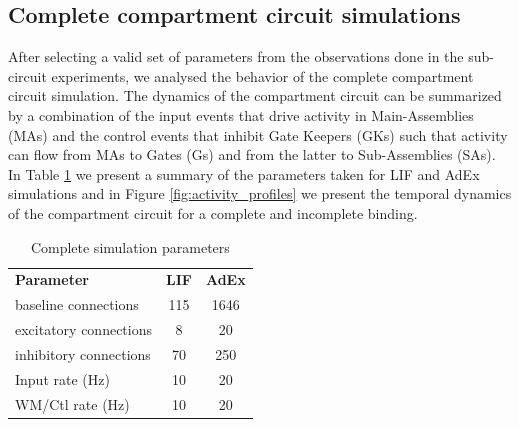 \documentclass[10pt]{article}
\begin{document}
\subsection{Complete compartment circuit simulations}
{\label{444332}}

After selecting a valid set of parameters from the observations done in the sub-circuit experiments, we analysed the behavior of the complete compartment circuit simulation.
The dynamics of the compartment circuit can be summarized by a combination of the input events that drive activity in Main-Assemblies (MAs) and the control events that inhibit Gate Keepers (GKs) such that activity can flow from MAs to Gates (Gs) and from the latter to Sub-Assemblies (SAs).
In Table \ref{table:simulation-parameters} we present a summary of the parameters taken for LIF and AdEx simulations and in Figure \ref{fig:activity_profiles} we present the temporal dynamics of the compartment circuit for a complete and incomplete binding.


\begin{table}[h!]
  \centering \normalsize
  \begin{tabular}{lcc}
    \textbf{Parameter} & \textbf{LIF} & \textbf{AdEx} \\
    baseline connections & 115 & 1646 \\
    excitatory connections & 8 & 20 \\
    inhibitory connections & 70 & 250 \\
    Input rate (Hz) & 10 & 20 \\
    WM/Ctl rate (Hz) & 10 & 20 \\
  \end{tabular}
  \caption{Complete simulation parameters}
  \label{table:simulation-parameters}
\end{table}
\end{document}

